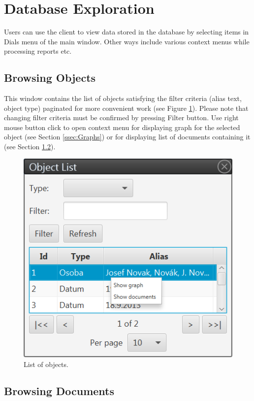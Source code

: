 \section{Database Exploration}
\label{ssec:ViewDatabase}

Users can use the client to view data stored in the database by selecting items
in Dials menu of the main window. Other ways include various context menus
while processing reports etc.

\subsection{Browsing Objects}
\label{sssec:ObjectList}

This window contains the list of objects satisfying the filter criteria (alias text,
object type) paginated for more convenient work (see Figure
\ref{fig:ObjectList}). Please note that changing filter criteria must be confirmed by pressing Filter button. Use right mouse button click to open context menu for displaying graph for the selected object (see Section \ref{ssec:Graphs}) or for displaying list of documents containing it (see
Section \ref{sssec:DocumentList}).

\begin{figure}[!htb]
        \centering
        \includegraphics{Images/objectlist}
        \caption{List of objects.}
        \label{fig:ObjectList}
\end{figure}

\subsection{Browsing Documents}
\label{sssec:DocumentList}

